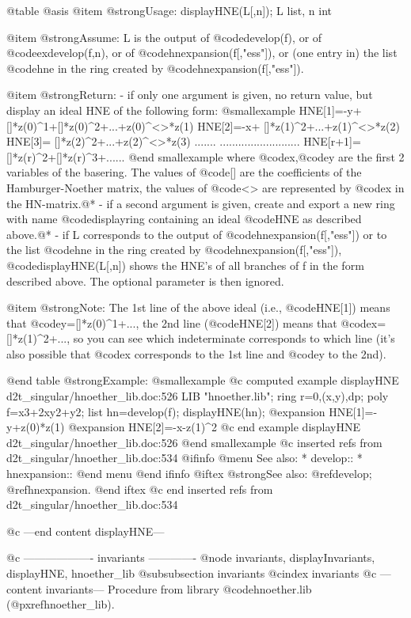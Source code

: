 @table @asis
@item @strong{Usage:}
displayHNE(L[,n]); L list, n int

@item @strong{Assume:}
L is the output of @code{develop(f)}, or of @code{exdevelop(f,n)},
or of @code{hnexpansion(f[,"ess"])}, or (one entry in) the list
@code{hne} in the ring created by @code{hnexpansion(f[,"ess"])}.

@item @strong{Return:}
- if only one argument is given, no return value, but
display an ideal HNE of the following form:
@smallexample
     HNE[1]=-y+[]*z(0)^1+[]*z(0)^2+...+z(0)^<>*z(1)
     HNE[2]=-x+          []*z(1)^2+...+z(1)^<>*z(2)
     HNE[3]=             []*z(2)^2+...+z(2)^<>*z(3)
     .......             ..........................
     HNE[r+1]=           []*z(r)^2+[]*z(r)^3+......
@end smallexample
where @code{x},@code{y} are the first 2 variables of the basering.
The values of @code{[]} are the coefficients of the Hamburger-Noether
matrix, the values of @code{<>} are represented by @code{x} in the
HN-matrix.@*
- if a second argument is given, create and export a new ring with
name @code{displayring} containing an ideal @code{HNE} as described
above.@*
- if L corresponds to the output of @code{hnexpansion(f[,"ess"])}
or to the list @code{hne} in the ring created by @code{hnexpansion(f[,"ess"])},
@code{displayHNE(L[,n])} shows the HNE's of all branches of f in the form
described above. The optional parameter is then ignored.

@item @strong{Note:}
The 1st line of the above ideal (i.e., @code{HNE[1]}) means that
@code{y=[]*z(0)^1+...}, the 2nd line (@code{HNE[2]}) means that
@code{x=[]*z(1)^2+...}, so you can see which indeterminate
corresponds to which line (it's also possible that @code{x} corresponds
to the 1st line and @code{y} to the 2nd).

@end table
@strong{Example:}
@smallexample
@c computed example displayHNE d2t_singular/hnoether_lib.doc:526 
LIB "hnoether.lib";
ring r=0,(x,y),dp;
poly f=x3+2xy2+y2;
list hn=develop(f);
displayHNE(hn);
@expansion{} HNE[1]=-y+z(0)*z(1)
@expansion{} HNE[2]=-x-z(1)^2
@c end example displayHNE d2t_singular/hnoether_lib.doc:526
@end smallexample
@c inserted refs from d2t_singular/hnoether_lib.doc:534
@ifinfo
@menu
See also:
* develop::
* hnexpansion::
@end menu
@end ifinfo
@iftex
@strong{See also:}
@ref{develop};
@ref{hnexpansion}.
@end iftex
@c end inserted refs from d2t_singular/hnoether_lib.doc:534

@c ---end content displayHNE---

@c ------------------- invariants -------------
@node invariants, displayInvariants, displayHNE, hnoether_lib
@subsubsection invariants
@cindex invariants
@c ---content invariants---
Procedure from library @code{hnoether.lib} (@pxref{hnoether_lib}).

